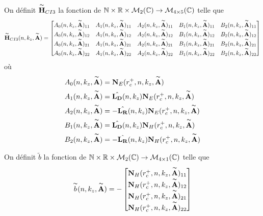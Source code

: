    \begin{defn}
      On définit \(\overset{\thicksim}{\mathbf{H}}_{CI3}\) la fonction de \(\mathbb N \times \mathbb R \times \mathcal{M}_2(\mathbb C) \rightarrow \mathcal{M}_{4\times5}(\mathbb C)\) telle que
      \begin{equation*}
        \overset{\thicksim}{\mathbf{H}}_{CI3}(n,k_z,\overset{\thicksim}{\mathbf{A}}) = 
        \begin{bmatrix}
          A_0(n,k_z,\overset{\thicksim}{\mathbf{A}})_{11} & A_1(n,k_z,\overset{\thicksim}{\mathbf{A}})_{11} & A_2(n,k_z,\overset{\thicksim}{\mathbf{A}})_{11} & B_1(n,k_z,\overset{\thicksim}{\mathbf{A}})_{11} & B_2(n,k_z,\overset{\thicksim}{\mathbf{A}})_{11}
          \\
          A_0(n,k_z,\overset{\thicksim}{\mathbf{A}})_{12} & A_1(n,k_z,\overset{\thicksim}{\mathbf{A}})_{12} & A_2(n,k_z,\overset{\thicksim}{\mathbf{A}})_{12} & B_1(n,k_z,\overset{\thicksim}{\mathbf{A}})_{12} & B_2(n,k_z,\overset{\thicksim}{\mathbf{A}})_{12}
          \\
          A_0(n,k_z,\overset{\thicksim}{\mathbf{A}})_{21} & A_1(n,k_z,\overset{\thicksim}{\mathbf{A}})_{21} & A_2(n,k_z,\overset{\thicksim}{\mathbf{A}})_{21} & B_1(n,k_z,\overset{\thicksim}{\mathbf{A}})_{21} & B_2(n,k_z,\overset{\thicksim}{\mathbf{A}})_{21}
          \\
          A_0(n,k_z,\overset{\thicksim}{\mathbf{A}})_{22} & A_1(n,k_z,\overset{\thicksim}{\mathbf{A}})_{22} & A_2(n,k_z,\overset{\thicksim}{\mathbf{A}})_{22} & B_1(n,k_z,\overset{\thicksim}{\mathbf{A}})_{22} & B_2(n,k_z,\overset{\thicksim}{\mathbf{A}})_{22}
        \end{bmatrix}
        \end{equation*}
        où
        \begin{align*}
          A_0(n,k_z,\overset{\thicksim}{\mathbf{A}}) &= \mathbf{N}_E(r_c^+,n,k_z,\overset{\thicksim}{\mathbf{A}})
          \\
          A_1(n,k_z,\overset{\thicksim}{\mathbf{A}}) &= \hat{\mathbf{L_D}}(n,k_z)\mathbf{N}_E(r_c^+,n,k_z,\overset{\thicksim}{\mathbf{A}})
          \\
          A_2(n,k_z,\overset{\thicksim}{\mathbf{A}}) &= -\hat{\mathbf{L_R}}(n,k_z)\mathbf{N}_E(r_c^+,n,k_z,\overset{\thicksim}{\mathbf{A}})
          \\
          B_1(n,k_z,\overset{\thicksim}{\mathbf{A}}) &= \hat{\mathbf{L_D}}(n,k_z)\mathbf{N}_H(r_c^+,n,k_z,\overset{\thicksim}{\mathbf{A}})
          \\
          B_2(n,k_z,\overset{\thicksim}{\mathbf{A}}) &= -\hat{\mathbf{L_R}}(n,k_z)\mathbf{N}_H(r_c^+,n,k_z,\overset{\thicksim}{\mathbf{A}})            
        \end{align*}

        On définit \(\tilde{b}\) la fonction de \(\mathbb N \times \mathbb R \times \mathcal{M}_2(\mathbb C) \rightarrow \mathcal{M}_{4\times1}(\mathbb C)\) telle que
        \begin{equation*}
          \overset{\thicksim}{b}(n,k_z,\overset{\thicksim}{\mathbf{A}}) = -
          \begin{bmatrix}
            \mathbf{N}_H(r_c^+,n,k_z,\overset{\thicksim}{\mathbf{A}})_{11}
            \\
            \mathbf{N}_H(r_c^+,n,k_z,\overset{\thicksim}{\mathbf{A}})_{12}
            \\
            \mathbf{N}_H(r_c^+,n,k_z,\overset{\thicksim}{\mathbf{A}})_{21}
            \\
            \mathbf{N}_H(r_c^+,n,k_z,\overset{\thicksim}{\mathbf{A}})_{22}
          \end{bmatrix}
        \end{equation*}
      \end{defn}

